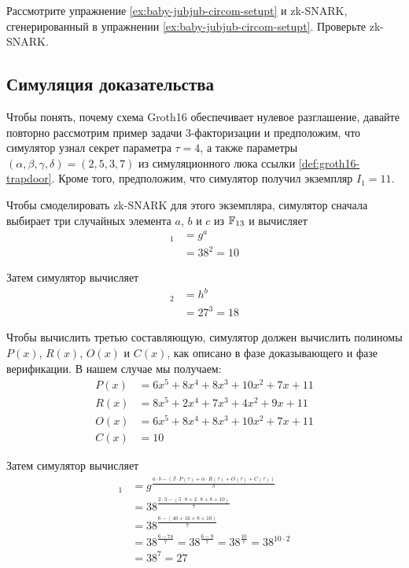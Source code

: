\begin{exercise}
\label{ex:baby-jubjub-circom-verify}
Рассмотрите упражнение \ref{ex:baby-jubjub-circom-setupt} и zk-SNARK, сгенерированный в упражнении \ref{ex:baby-jubjub-circom-setupt}. Проверьте zk-SNARK.
\end{exercise}

\subsection{Симуляция доказательства} Чтобы понять, почему схема Groth16 обеспечивает нулевое разглашение, давайте повторно рассмотрим пример задачи 3-факторизации и предположим, что симулятор узнал секрет параметра $\tau=4$, а также параметры $(\alpha,\beta,\gamma,\delta)=(2,5,3,7)$ из симуляционного люка ссылки \ref{def:groth16-trapdoor}. Кроме того, предположим, что симулятор получил экземпляр $I_1=11$.

Чтобы смоделировать zk-SNARK для этого экземпляра, симулятор сначала выбирает три случайных элемента $a$, $b$ и $c$ из $\mathbb{F}_{13}$ и вычисляет
\begin{align*}
[\mathbb{A}]_1 & = g^{a}\\
               & = 38^{2} = 10
\end{align*}

Затем симулятор вычисляет
\begin{align*}
[\mathbb{B}]_2 & = h^{b}\\
               & = 27^{3} = 18
\end{align*}

Чтобы вычислить третью составляющую, симулятор должен вычислить полиномы $P(x)$, $R(x)$, $O(x)$ и $C(x)$, как описано в фазе доказывающего и фазе верификации. В нашем случае мы получаем:
\begin{align*}
P(x) & = 6x^5 + 8x^4 + 8x^3 + 10x^2 + 7x + 11\\
R(x) & = 8x^5 + 2x^4 + 7x^3 + 4x^2 + 9x + 11\\
O(x) & = 6x^5 + 8x^4 + 8x^3 + 10x^2 + 7x + 11\\
C(x) & = 10
\end{align*}

Затем симулятор вычисляет
\begin{align*}
[\mathbb{C}]_1 & = g^{\frac{a\cdot b - (\beta\cdot P(\tau) + \alpha\cdot R(\tau) + O(\tau) + C(\tau))}{\delta}}\\
               & = 38^{\frac{2\cdot 3 - (5\cdot 8 + 2\cdot 8 + 8 + 10)}{7}}\\
               & = 38^{\frac{6 - (40 + 16 + 8 + 10)}{7}}\\
               & = 38^{\frac{6 - 74}{7}} = 38^{\frac{6 - 9}{7}} = 38^{\frac{10}{7}} = 38^{10\cdot 2}\\
               & = 38^{7} = 27
\end{align*}

